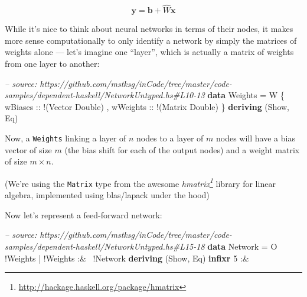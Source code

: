 \documentclass[]{article}
\newenvironment{Shaded}{}{}
\newcommand{\KeywordTok}[1]{\textcolor[rgb]{0.00,0.44,0.13}{\textbf{{#1}}}}
\newcommand{\DataTypeTok}[1]{\textcolor[rgb]{0.56,0.13,0.00}{{#1}}}
\newcommand{\DecValTok}[1]{\textcolor[rgb]{0.25,0.63,0.44}{{#1}}}
\newcommand{\CommentTok}[1]{\textcolor[rgb]{0.38,0.63,0.69}{\textit{{#1}}}}
\newcommand{\OtherTok}[1]{\textcolor[rgb]{0.00,0.44,0.13}{{#1}}}
\newcommand{\FunctionTok}[1]{\textcolor[rgb]{0.02,0.16,0.49}{{#1}}}
\newcommand{\NormalTok}[1]{{#1}}
\renewcommand{\href}[2]{#2\footnote{\url{#1}}}
\begin{document}
\[
\mathbf{y} = \mathbf{b} + \hat{W} \mathbf{x}
\]

While it's nice to think about neural networks in terms of their nodes,
it makes more sense computationally to only identify a network by simply
the matrices of weights alone --- let's imagine one ``layer'', which is
actually a matrix of weights from one layer to another:

\begin{Shaded}
\begin{Highlighting}[]
\CommentTok{-- source: https://github.com/mstksg/inCode/tree/master/code-samples/dependent-haskell/NetworkUntyped.hs#L10-13}
\KeywordTok{data} \DataTypeTok{Weights} \FunctionTok{=} \DataTypeTok{W} \NormalTok{\{}\OtherTok{ wBiases  ::} \FunctionTok{!}\NormalTok{(}\DataTypeTok{Vector} \DataTypeTok{Double}\NormalTok{)}
                 \NormalTok{,}\OtherTok{ wWeights ::} \FunctionTok{!}\NormalTok{(}\DataTypeTok{Matrix} \DataTypeTok{Double}\NormalTok{)}
                 \NormalTok{\}}
  \KeywordTok{deriving} \NormalTok{(}\DataTypeTok{Show}\NormalTok{, }\DataTypeTok{Eq}\NormalTok{)}
\end{Highlighting}
\end{Shaded}

Now, a \texttt{Weights} linking a layer of \(n\) nodes to a layer of
\(m\) nodes will have a bias vector of size \(m\) (the bias shift for
each of the output nodes) and a weight matrix of size \(m \times n\).

(We're using the \texttt{Matrix} type from the awesome
\emph{\href{http://hackage.haskell.org/package/hmatrix}{hmatrix}}
library for linear algebra, implemented using blas/lapack under the
hood)

Now let's represent a feed-forward network:

\begin{Shaded}
\begin{Highlighting}[]
\CommentTok{-- source: https://github.com/mstksg/inCode/tree/master/code-samples/dependent-haskell/NetworkUntyped.hs#L15-18}
\KeywordTok{data} \DataTypeTok{Network} \FunctionTok{=} \DataTypeTok{O} \FunctionTok{!}\DataTypeTok{Weights}
             \FunctionTok{|} \FunctionTok{!}\DataTypeTok{Weights} \FunctionTok{:&~} \FunctionTok{!}\DataTypeTok{Network}
  \KeywordTok{deriving} \NormalTok{(}\DataTypeTok{Show}\NormalTok{, }\DataTypeTok{Eq}\NormalTok{)}
\KeywordTok{infixr} \DecValTok{5} \FunctionTok{:&~}
\end{Highlighting}
\end{Shaded}
\end{document}
